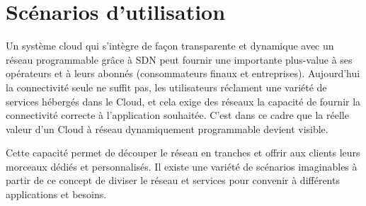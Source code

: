 
\section{Scénarios d'utilisation}

Un système cloud qui s'intègre de façon transparente et dynamique avec un réseau programmable grâce à SDN peut fournir une importante plus-value à ses opérateurs et à leurs abonnés (consommateurs finaux et entreprises). Aujourd'hui la connectivité seule ne suffit pas, les utilisateurs réclament une variété de services hébergés dans le Cloud, et cela exige des réseaux la capacité de fournir la connectivité correcte à l'application souhaitée. C'est dans ce cadre que  la réelle valeur d'un Cloud à réseau dynamiquement programmable  devient visible.

Cette capacité permet de découper le réseau en tranches et offrir aux clients leurs morceaux dédiés et personnalisés. Il existe une variété de scénarios imaginables  à partir de ce concept de diviser le réseau et services pour convenir à différents applications et besoins.

